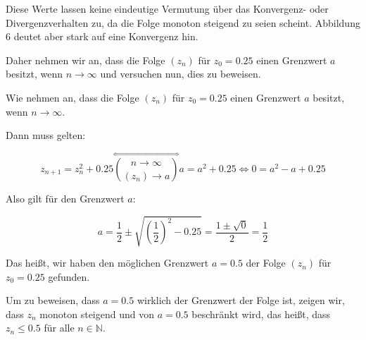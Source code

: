 \documentclass[a4paper, 12pt]{book}
\begin{document}
Diese Werte lassen keine eindeutige Vermutung über das Konvergenz- oder
Divergenzverhalten zu, da die Folge monoton steigend zu seien scheint.
Abbildung 6 deutet aber stark auf eine Konvergenz hin.

Daher nehmen wir an, dass die Folge \(\left( z_{n} \right)\) für
\(z_{0} = 0.25\) einen Grenzwert \(a\) besitzt, wenn
\(n \rightarrow \infty\) und versuchen nun, dies zu beweisen.

Wie nehmen an, dass die Folge \(\left( z_{n} \right)\) für
\(z_{0} = 0.25\) einen Grenzwert \(a\) besitzt, wenn
\(n \rightarrow \infty\).

Dann muss gelten:

\[z_{n + 1} = z_{n}^{2} + 0.25\overset{\Leftrightarrow}{\binom{n \rightarrow \infty}{\left( z_{n} \right) \rightarrow a}}a = a^{2} + 0.25 \Longleftrightarrow 0 = a^{2} - a + 0.25\]

Also gilt für den Grenzwert \(a\):

\[a = \frac{1}{2} \pm \sqrt{\left( \frac{1}{2} \right)^{2} - 0.25} = \frac{1 \pm \sqrt{0}}{2} = \frac{1}{2}\]

Das heißt, wir haben den möglichen Grenzwert \(a = 0.5\) der Folge
\(\left( z_{n} \right)\) für \(z_{0} = 0.25\) gefunden.

Um zu beweisen, dass \(a = 0.5\) wirklich der Grenzwert der Folge
ist, zeigen wir, dass \(z_{n}\) monoton steigend und von \(a = 0.5\)
beschränkt wird, das heißt, dass \(z_{n} \leq 0.5\) für alle
\(n\mathbb{ \in N}\).
\end{document}
